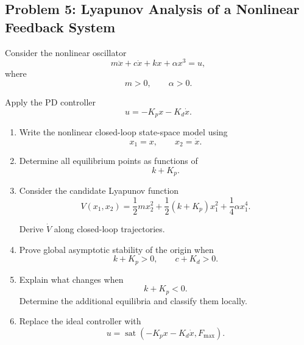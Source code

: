 \subsection*{Problem 5: Lyapunov Analysis of a Nonlinear Feedback System}

Consider the nonlinear oscillator
\begin{equation}
m\ddot{x}
+
c\dot{x}
+
kx
+
\alpha x^3
=
u,
\end{equation}
where
\begin{equation}
m>0,
\qquad
\alpha>0.
\end{equation}

Apply the PD controller
\begin{equation}
u=-K_px-K_d\dot{x}.
\end{equation}

\begin{enumerate}
    \item Write the nonlinear closed-loop state-space model using
    \begin{equation}
    x_1=x,
    \qquad
    x_2=\dot{x}.
    \end{equation}

    \item Determine all equilibrium points as functions of
    \begin{equation}
    k+K_p.
    \end{equation}

    \item Consider the candidate Lyapunov function
    \begin{equation}
    V(x_1,x_2)
    =
    \frac{1}{2}mx_2^2
    +
    \frac{1}{2}(k+K_p)x_1^2
    +
    \frac{1}{4}\alpha x_1^4.
    \end{equation}

    Derive $\dot{V}$ along closed-loop trajectories.

    \item Prove global asymptotic stability of the origin when
    \begin{equation}
    k+K_p>0,
    \qquad
    c+K_d>0.
    \end{equation}

    \item Explain what changes when
    \begin{equation}
    k+K_p<0.
    \end{equation}
    Determine the additional equilibria and classify them locally.

    \item Replace the ideal controller with
    \begin{equation}
    u
    =
    \operatorname{sat}
    \left(
    -K_px-K_d\dot{x},
    F_{\max}
    \right).
    \end{equation}


\end{enumerate}
